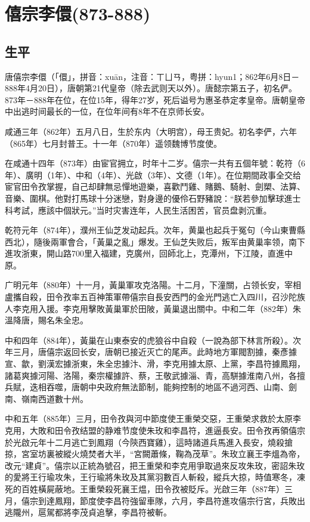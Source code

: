 
\section{僖宗李儇\tiny(873-888)}

\subsection{生平}

唐僖宗李儇（「儇」，拼音：xuān，注音：ㄒㄩㄢ，粤拼：hyun1；862年6月8日－888年4月20日），唐朝第21代皇帝（除去武则天以外）。唐懿宗第五子，初名俨。873年－888年在位，在位15年，得年27岁，死后谥号为惠圣恭定孝皇帝。唐朝皇帝中出逃时间最长的一位，在位年间有8年不在京师长安。

咸通三年（862年）五月八日，生於东内（大明宫），母王贵妃。初名李俨，六年（865年）七月封普王。十一年（870年）遥领魏博节度使。

在咸通十四年（873年）由宦官拥立，时年十二岁。僖宗一共有五個年號：乾符（6年）、廣明（1年）、中和（4年）、光啟（3年）、文德（1年）。在位期間政事全交给宦官田令孜掌握，自己却肆無忌憚地遊樂，喜歡鬥雞、賭鵝、騎射、劍槊、法算、音樂、圍棋。他對打馬球十分迷戀，對身邊的優伶石野豬說：“朕若參加擊球進士科考試，應該中個狀元。”当时灾害连年，人民生活困苦，官员盘剥沉重。

乾符元年（874年），濮州王仙芝发动起兵。次年，黄巢也起兵于冤句（今山東曹縣西北），隨後兩軍會合，「黃巢之亂」爆发。王仙芝失败后，叛军由黄巢率领，南下進攻浙東，開山路700里入福建，克廣州，回師北上，克潭州，下江陵，直進中原。

广明元年（880年）十一月，黃巢軍攻克洛陽。十二月，下潼關，占领长安，宰相盧攜自殺，田令孜率五百神策軍帶僖宗自長安西門的金光門逃亡入四川，召沙陀族人李克用入援。李克用擊敗黃巢軍於田陂，黃巢退出關中。中和二年（882年）朱溫降唐，賜名朱全忠。

中和四年（884年），黃巢在山東泰安的虎狼谷中自殺（一說為部下林言所殺）。次年三月，唐僖宗返回长安，唐朝已接近灭亡的尾声。此時地方軍閥割據，秦彥據宣、歙，劉漢宏據浙東，朱全忠據汴、滑，李克用據太原、上黨，李昌符據鳳翔，諸葛爽據河陽、洛陽，秦宗權據許、蔡，王敬武據淄、青，高駢據淮南八州，各擅兵賦，迭相吞噬，唐朝中央政府無法節制，能夠控制的地區不過河西、山南、劍南、嶺南西道數十州。

中和五年（885年）三月，田令孜與河中節度使王重榮交惡，王重榮求救於太原李克用，大敗和田令孜结盟的静难节度使朱玫和李昌符，進逼長安。田令孜再領僖宗於光啟元年十二月逃亡到鳳翔（今陝西寶雞），這時諸道兵馬進入長安，燒殺搶掠，宮室坊裏被縱火燒焚者大半，“宮闕蕭條，鞠為茂草”。朱玫立襄王李熅為帝，改元“建貞”。僖宗以正統為號召，把王重榮和李克用爭取過來反攻朱玫，密詔朱玫的愛將王行瑜攻朱，王行瑜將朱玫及其黨羽數百人斬殺，縱兵大掠，時值寒冬，凍死的百姓橫屍蔽地。王重榮殺死襄王煴，田令孜被貶斥。光啟三年（887年）三月，僖宗到達鳳翔，節度使李昌符強留車隊，六月，李昌符進攻僖宗行宮，兵敗出逃隴州，扈駕都將李茂貞追擊，李昌符被斬。


